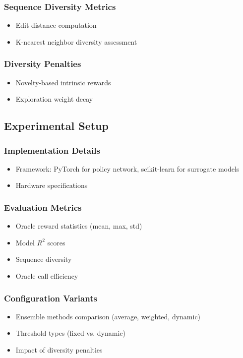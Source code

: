 \documentclass[conference]{IEEEtran}
\begin{document}
\subsubsection{Sequence Diversity Metrics}
\begin{itemize}
    \item Edit distance computation
    \item K-nearest neighbor diversity assessment
\end{itemize}

\subsubsection{Diversity Penalties}
\begin{itemize}
    \item Novelty-based intrinsic rewards
    \item Exploration weight decay
\end{itemize}






\subsection{Experimental Setup}
\subsubsection{Implementation Details}
\begin{itemize}
    \item Framework: PyTorch for policy network, scikit-learn for surrogate models
    \item Hardware specifications
\end{itemize}

\subsubsection{Evaluation Metrics}
\begin{itemize}
    \item Oracle reward statistics (mean, max, std)
    \item Model $R^2$ scores
    \item Sequence diversity
    \item Oracle call efficiency
\end{itemize}

\subsubsection{Configuration Variants}
\begin{itemize}
    \item Ensemble methods comparison (average, weighted, dynamic)
    \item Threshold types (fixed vs. dynamic)
    \item Impact of diversity penalties
\end{itemize}
\end{document}
